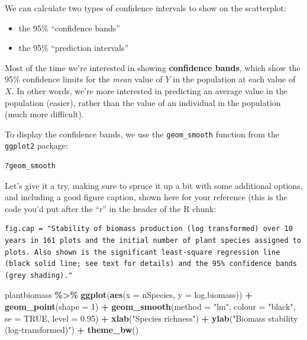 \documentclass[
]{book}
\newenvironment{Shaded}{\begin{snugshade}}{\end{snugshade}}
\newcommand{\AttributeTok}[1]{\textcolor[rgb]{0.13,0.29,0.53}{#1}}
\newcommand{\ConstantTok}[1]{\textcolor[rgb]{0.56,0.35,0.01}{#1}}
\newcommand{\DecValTok}[1]{\textcolor[rgb]{0.00,0.00,0.81}{#1}}
\newcommand{\FloatTok}[1]{\textcolor[rgb]{0.00,0.00,0.81}{#1}}
\newcommand{\FunctionTok}[1]{\textcolor[rgb]{0.13,0.29,0.53}{\textbf{#1}}}
\newcommand{\NormalTok}[1]{#1}
\newcommand{\SpecialCharTok}[1]{\textcolor[rgb]{0.81,0.36,0.00}{\textbf{#1}}}
\newcommand{\StringTok}[1]{\textcolor[rgb]{0.31,0.60,0.02}{#1}}
\providecommand{\tightlist}{%
  \setlength{\itemsep}{0pt}\setlength{\parskip}{0pt}}
\begin{document}
We can calculate two types of confidence intervals to show on the scatterplot:

\begin{itemize}
\tightlist
\item
  the 95\% ``confidence bands''\\
\item
  the 95\% ``prediction intervals''
\end{itemize}

Most of the time we're interested in showing \textbf{confidence bands}, which show the 95\% confidence limits for the \emph{mean} value of \(Y\) in the population at each value of \(X\). In other words, we're more interested in predicting an average value in the population (easier), rather than the value of an individual in the population (much more difficult).

To display the confidence bands, we use the \texttt{geom\_smooth} function from the \texttt{ggplot2} package:

\begin{verbatim}
?geom_smooth
\end{verbatim}

Let's give it a try, making sure to spruce it up a bit with some additional options, and including a good figure caption, shown here for your reference (this is the code you'd put after the ``r'' in the header of the R chunk:

\begin{verbatim}
fig.cap = "Stability of biomass production (log transformed) over 10 years in 161 plots and the initial number of plant species assigned to plots. Also shown is the significant least-square regression line (black solid line; see text for details) and the 95% confidence bands (grey shading)."
\end{verbatim}

\begin{Shaded}
\begin{Highlighting}[]
\NormalTok{plantbiomass }\SpecialCharTok{\%\textgreater{}\%}
\FunctionTok{ggplot}\NormalTok{(}\FunctionTok{aes}\NormalTok{(}\AttributeTok{x =}\NormalTok{ nSpecies, }\AttributeTok{y =}\NormalTok{ log.biomass)) }\SpecialCharTok{+}
  \FunctionTok{geom\_point}\NormalTok{(}\AttributeTok{shape =} \DecValTok{1}\NormalTok{) }\SpecialCharTok{+}
  \FunctionTok{geom\_smooth}\NormalTok{(}\AttributeTok{method =} \StringTok{"lm"}\NormalTok{, }\AttributeTok{colour =} \StringTok{"black"}\NormalTok{, }
              \AttributeTok{se =} \ConstantTok{TRUE}\NormalTok{, }\AttributeTok{level =} \FloatTok{0.95}\NormalTok{) }\SpecialCharTok{+}
  \FunctionTok{xlab}\NormalTok{(}\StringTok{"Species richness"}\NormalTok{) }\SpecialCharTok{+}
  \FunctionTok{ylab}\NormalTok{(}\StringTok{"Biomass stability (log{-}transformed)"}\NormalTok{) }\SpecialCharTok{+}
  \FunctionTok{theme\_bw}\NormalTok{()}
\end{Highlighting}
\end{Shaded}
\end{document}
